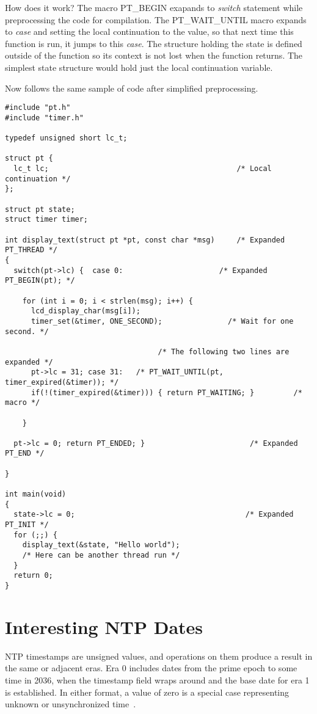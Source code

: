 How does it work? The macro PT\_BEGIN exapands to {\it switch} statement while preprocessing the
code for compilation.
The PT\_WAIT\_UNTIL macro expands to {\it case} and setting the local continuation
to the value, so that next time this function is run, it jumps to this {\it case}.
The structure holding the state is defined outside of the function so its context is not lost when
the function returns. The simplest state structure would hold just the local continuation variable.

Now follows
the same sample of code after simplified preprocessing.
\begin{lstlisting}
#include "pt.h"
#include "timer.h"

typedef unsigned short lc_t;

struct pt {
  lc_t lc;                                           /* Local continuation */
}; 

struct pt state;
struct timer timer;

int display_text(struct pt *pt, const char *msg)     /* Expanded PT_THREAD */
{
  switch(pt->lc) {  case 0:                      /* Expanded PT_BEGIN(pt); */
  
    for (int i = 0; i < strlen(msg); i++) {
      lcd_display_char(msg[i]);
      timer_set(&timer, ONE_SECOND);               /* Wait for one second. */
    
                                   /* The following two lines are expanded */
      pt->lc = 31; case 31:   /* PT_WAIT_UNTIL(pt, timer_expired(&timer)); */
      if(!(timer_expired(&timer))) { return PT_WAITING; }         /* macro */
    
    }
  
  pt->lc = 0; return PT_ENDED; }                        /* Expanded PT_END */
  
}

int main(void)
{
  state->lc = 0;                                       /* Expanded PT_INIT */
  for (;;) {
    display_text(&state, "Hello world");
    /* Here can be another thread run */
  }
  return 0;
}

\end{lstlisting}

\chapter{Interesting NTP Dates}\label{app:dates}
NTP timestamps are unsigned values, and operations on them produce a
result in the same or adjacent eras.
Era 0 includes dates from the prime epoch to some time in 2036,
when the timestamp field wraps around and the base date for era 1 is established.
In either format, a value of zero is a special case representing unknown or
unsynchronized time~\cite{rfc5905}.

